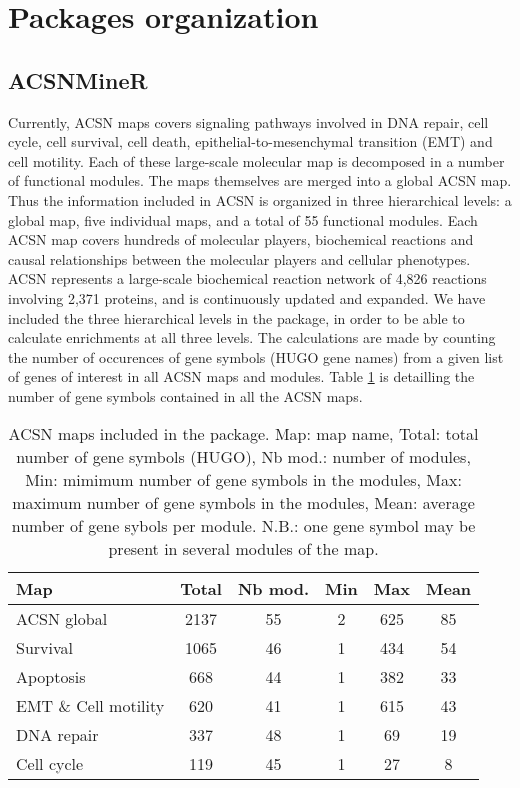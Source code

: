 \documentclass[article]{jss}
\begin{document}
\section[Package organization]{Packages organization}

\subsection{ACSNMineR}
Currently, ACSN maps covers signaling pathways involved in DNA repair, cell
cycle, cell survival, cell death, epithelial-to-mesenchymal transition (EMT) and
cell motility. Each of these large-scale molecular map is decomposed in a number
of functional modules. The maps themselves are merged into a global ACSN map.
Thus the information included in ACSN is organized in three hierarchical levels:
a global map, five individual maps, and a total of 55 functional modules. Each
ACSN map covers hundreds of molecular players, biochemical reactions and causal
relationships between the molecular players and cellular phenotypes.  ACSN
represents a large-scale biochemical reaction network of 4,826 reactions
involving 2,371 proteins, and is continuously updated and expanded.  We have
included the three hierarchical levels in the  package, in order
to be able to calculate enrichments at all three levels. The calculations are
made by counting the number of occurences of gene symbols (HUGO gene names) from
a given list of genes of interest in all ACSN maps and modules. Table
\ref{tab:table1} is detailling the number of gene symbols contained in all the ACSN
maps.


\begin{table}[h!]
 \centering
  \caption{ACSN maps included in the  package. Map: map name, Total: total
  number of gene symbols (HUGO), Nb mod.: number of modules, Min: mimimum
  number of gene symbols in the modules, Max: maximum number of gene symbols in
  the modules, Mean: average number of gene sybols per module. N.B.: one gene
  symbol may be present in several modules of the map.}
  \label{tab:table1}
  \begin{tabular}{l|c|c|c|c|c}
    \hline
    Map & Total & Nb mod. & Min & Max & Mean\\
    \hline
  ACSN global & 2137 & 55 & 2 &625& 85\\
  Survival  &1065&46  &1 &434 &54\\
  Apoptosis & 668&44 & 1& 382& 33\\
  EMT \& Cell motility &620 &41  &1 &615 &43\\
  DNA repair &337&48  &1 &69  &19\\
  Cell cycle &119&45  &1 &27  &8\\
  \hline

  \end{tabular}

\end{table}
\end{document}

